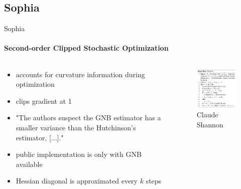 \documentclass[
	11pt, %
	aspectratio=169, %
]{beamer}
\begin{document}
\subsection{Sophia}
\begin{frame}{Sophia}
	\framesubtitle{\textbf{S}econd-\textbf{o}rder Clip\textbf{p}ed Stoc\textbf{h}astic Opt\textbf{i}miz\textbf{a}tion}
	 \begin{columns}[c] %
		\begin{column}{0.45\textwidth} %
			\begin{itemize}
				\item accounts for curvature information during optimization
				\item clips gradient at 1
				\item "The authors suspect the GNB estimator has a smaller variance than the Hutchinson’s
				estimator, [...]."
				\item public implementation is only with GNB available
				\item Hessian diagonal is approximated every $k$ steps
			\end{itemize}
		\end{column}
		\begin{column}{0.55\textwidth} %
        	\begin{figure}
        	    \centering
                \includegraphics[width=6.5cm]{figures/sophia_algo.png}
        	    \caption*{Claude Shannon}
        	\end{figure}
		\end{column}
	\end{columns}
\end{frame}
\end{document}
